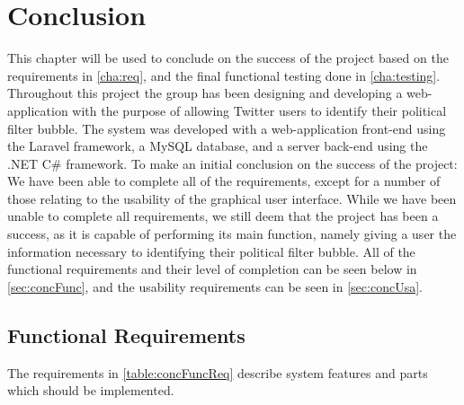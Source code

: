 \chapter{Conclusion}\label{cha:conclusion}
This chapter will be used to conclude on the success of the project based on the
requirements in \autoref{cha:req}, and the final functional testing done in
\autoref{cha:testing}. Throughout this project the group has been designing and
developing a web-application with the purpose of allowing Twitter users to identify their
political filter bubble. The system was developed with a web-application
front-end using the Laravel framework, a MySQL database, and a server back-end using the .NET C\# framework. 
To make an initial conclusion on the success of the project: We have been able
to complete all of the requirements, except for a number of those relating to
the usability of the graphical user interface. While we have been unable to
complete all requirements, we still deem that the project has been a success, as
it is capable of performing its main function, namely giving a user the
information necessary to identifying their political filter bubble. All of
the functional requirements and their level of completion can be seen below in
\autoref{sec:concFunc}, and the usability requirements can be seen in
\autoref{sec:concUsa}.

\section{Functional Requirements}\label{sec:concFunc}
The requirements in \autoref{table:concFuncReq} describe system
features and parts which should be implemented.

